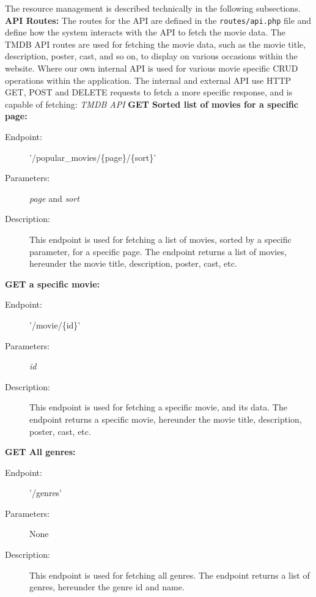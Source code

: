 The resource management is described technically in the following subsections. \newline
\textbf{API Routes:}
The routes for the API are defined in the \texttt{routes/api.php} file and define how the system interacts with the API to fetch the movie data. The TMDB API routes are used for fetching the movie data, such as the movie title, description, poster, cast, and so on, to display on various occasions within the website. Where our own internal API is used for various movie specific CRUD operations within the application. 
The internal and external API use HTTP GET, POST and DELETE requests to fetch a more specific response, and is capable of fetching: \newline\newline
\textit{TMDB API} 
\textbf{\newline GET Sorted list of movies for a specific page:}
\begin{description}
    \item[Endpoint:] '/popular\_movies/\{page\}/\{sort\}'
    \item[Parameters:] \textit{page} and \textit{sort}
    \item[Description:] This endpoint is used for fetching a list of movies, sorted by a specific parameter, for a specific page. The endpoint returns a list of movies, hereunder the movie title, description, poster, cast, etc.
\end{description} 
\textbf{GET a specific movie:}
\begin{description}
    \item [Endpoint:] '/movie/\{id\}'
    \item [Parameters:] \textit{id}
    \item [Description:] This endpoint is used for fetching a specific movie, and its data. The endpoint returns a specific movie, hereunder the movie title, description, poster, cast, etc.
\end{description} 
\textbf{GET All genres:}
\begin{description}
    \item [Endpoint:] '/genres'
    \item [Parameters:] None
    \item [Description:] This endpoint is used for fetching all genres. The endpoint returns a list of genres, hereunder the genre id and name.
\end{description}

